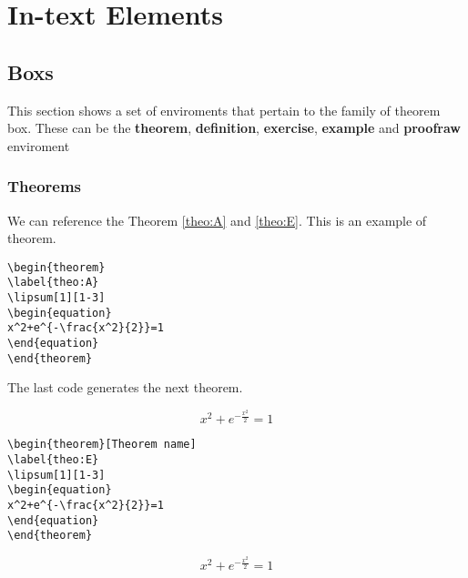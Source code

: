 \chapter{In-text Elements}

\section{Boxs}

This section shows a set of enviroments that pertain to the family of theorem box.
These can be the 
\textbf{theorem}, 
\textbf{definition}, 
\textbf{exercise}, 
\textbf{example} and 
\textbf{proofraw} enviroment 

\subsection{Theorems}

We can reference the Theorem \ref{theo:A} and \ref{theo:E}.
This is an example of theorem.
\begin{highlightbox}
\begin{verbatim}
\begin{theorem}
\label{theo:A}
\lipsum[1][1-3]
\begin{equation}
x^2+e^{-\frac{x^2}{2}}=1
\end{equation}
\end{theorem}
\end{verbatim}
\end{highlightbox}

The last code generates the next theorem.
\begin{theorem}
\label{theo:A}
\lipsum[1][1-3]
\begin{equation}
x^2+e^{-\frac{x^2}{2}}=1
\end{equation}
\end{theorem}



\begin{highlightbox}
\begin{verbatim}
\begin{theorem}[Theorem name]
\label{theo:E}
\lipsum[1][1-3]
\begin{equation}
x^2+e^{-\frac{x^2}{2}}=1
\end{equation}
\end{theorem}
\end{verbatim}
\end{highlightbox}
\begin{theorem}
\label{theo:E}
\lipsum[1][1-3]
\begin{equation}
x^2+e^{-\frac{x^2}{2}}=1
\end{equation}
\end{theorem}

